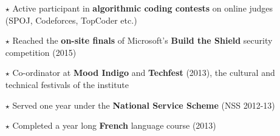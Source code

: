 \documentclass[a4paper]{article}
\begin{document}
\begin{itemize}[itemsep = -0.3 mm, leftmargin=*]

\item[$\star$] Active participant in \textbf{algorithmic coding contests} on online  judges (SPOJ, Codeforces, TopCoder etc.)

\item[$\star$] Reached the \textbf{on-site finals} of Microsoft's \textbf{Build the Shield} security competition (2015)

\item[$\star$] Co-ordinator at \textbf{Mood Indigo} and \textbf{Techfest} (2013), the cultural and technical festivals of the institute 

\item[$\star$] Served one year under the \textbf{National Service Scheme} (NSS 2012-13) 

\item[$\star$] Completed a year long \textbf{French} language course (2013)

\end{itemize}
\end{document}
